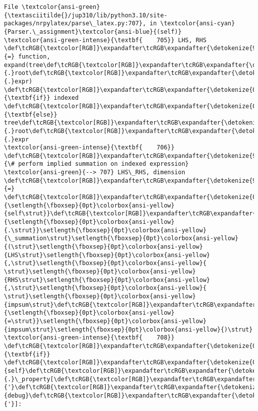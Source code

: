 \documentclass[landscape,letterpaper,10pt,english]{article}
\begin{document}
\begin{Verbatim}[commandchars=\\\{\}, frame=single, framerule=2mm, rulecolor=\color{outerrorbackground}]
File \textcolor{ansi-green}{\textasciitilde{}/jup310/lib/python3.10/site-packages/nrpylatex/parse\_latex.py:707}, in \textcolor{ansi-cyan}{Parser.\_assignment}\textcolor{ansi-blue}{(self)}
\textcolor{ansi-green-intense}{\textbf{    705}} LHS, RHS \def\tcRGB{\textcolor[RGB]}\expandafter\tcRGB\expandafter{\detokenize{98,98,98}}{=} function, expand(tree\def\tcRGB{\textcolor[RGB]}\expandafter\tcRGB\expandafter{\detokenize{98,98,98}}{.}root\def\tcRGB{\textcolor[RGB]}\expandafter\tcRGB\expandafter{\detokenize{98,98,98}}{.}expr) \def\tcRGB{\textcolor[RGB]}\expandafter\tcRGB\expandafter{\detokenize{0,135,0}}{\textbf{if}} indexed \def\tcRGB{\textcolor[RGB]}\expandafter\tcRGB\expandafter{\detokenize{0,135,0}}{\textbf{else}} tree\def\tcRGB{\textcolor[RGB]}\expandafter\tcRGB\expandafter{\detokenize{98,98,98}}{.}root\def\tcRGB{\textcolor[RGB]}\expandafter\tcRGB\expandafter{\detokenize{98,98,98}}{.}expr
\textcolor{ansi-green-intense}{\textbf{    706}} \def\tcRGB{\textcolor[RGB]}\expandafter\tcRGB\expandafter{\detokenize{95,135,135}}{\# perform implied summation on indexed expression}
\textcolor{ansi-green}{--> 707} LHS\_RHS, dimension \def\tcRGB{\textcolor[RGB]}\expandafter\tcRGB\expandafter{\detokenize{98,98,98}}{=} \def\tcRGB{\textcolor[RGB]}\expandafter\tcRGB\expandafter{\detokenize{0,135,0}}{\setlength{\fboxsep}{0pt}\colorbox{ansi-yellow}{self\strut}}\def\tcRGB{\textcolor[RGB]}\expandafter\tcRGB\expandafter{\detokenize{98,98,98}}{\setlength{\fboxsep}{0pt}\colorbox{ansi-yellow}{.\strut}}\setlength{\fboxsep}{0pt}\colorbox{ansi-yellow}{\_summation\strut}\setlength{\fboxsep}{0pt}\colorbox{ansi-yellow}{(\strut}\setlength{\fboxsep}{0pt}\colorbox{ansi-yellow}{LHS\strut}\setlength{\fboxsep}{0pt}\colorbox{ansi-yellow}{,\strut}\setlength{\fboxsep}{0pt}\colorbox{ansi-yellow}{ \strut}\setlength{\fboxsep}{0pt}\colorbox{ansi-yellow}{RHS\strut}\setlength{\fboxsep}{0pt}\colorbox{ansi-yellow}{,\strut}\setlength{\fboxsep}{0pt}\colorbox{ansi-yellow}{ \strut}\setlength{\fboxsep}{0pt}\colorbox{ansi-yellow}{impsum\strut}\def\tcRGB{\textcolor[RGB]}\expandafter\tcRGB\expandafter{\detokenize{98,98,98}}{\setlength{\fboxsep}{0pt}\colorbox{ansi-yellow}{=\strut}}\setlength{\fboxsep}{0pt}\colorbox{ansi-yellow}{impsum\strut}\setlength{\fboxsep}{0pt}\colorbox{ansi-yellow}{)\strut}
\textcolor{ansi-green-intense}{\textbf{    708}} \def\tcRGB{\textcolor[RGB]}\expandafter\tcRGB\expandafter{\detokenize{0,135,0}}{\textbf{if}} \def\tcRGB{\textcolor[RGB]}\expandafter\tcRGB\expandafter{\detokenize{0,135,0}}{self}\def\tcRGB{\textcolor[RGB]}\expandafter\tcRGB\expandafter{\detokenize{98,98,98}}{.}\_property[\def\tcRGB{\textcolor[RGB]}\expandafter\tcRGB\expandafter{\detokenize{175,0,0}}{'}\def\tcRGB{\textcolor[RGB]}\expandafter\tcRGB\expandafter{\detokenize{175,0,0}}{debug}\def\tcRGB{\textcolor[RGB]}\expandafter\tcRGB\expandafter{\detokenize{175,0,0}}{'}]:

\end{Verbatim}
\end{document}
